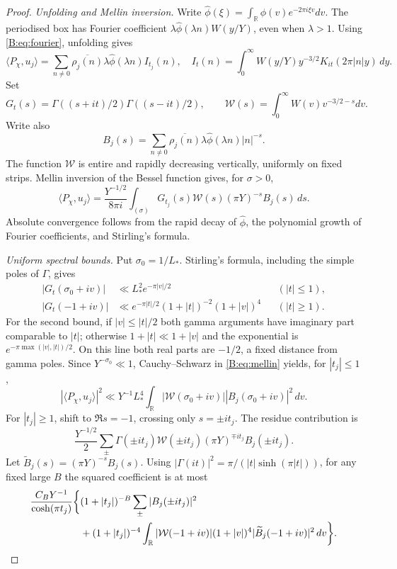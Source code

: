 \documentclass[10pt,reqno]{amsart}
\theoremstyle{definition}
\numberwithin{equation}{section}
\newcommand{\R}{\mathbb R}
\begin{document}
\begin{proof}
\emph{Unfolding and Mellin inversion.}
Write \(\widehat\phi(\xi)=\int_\R\phi(v)e^{-2\pi i\xi v}dv\).
The periodised box has Fourier coefficient
\(\lambda\widehat\phi(\lambda n)W(y/Y)\), even when \(\lambda>1\).
Using \eqref{B:eq:fourier}, unfolding gives
\[
 \langle P_\chi,u_j\rangle
 =\sum_{n\ne0}\overline{\rho_j(n)}\lambda\widehat\phi(\lambda n)I_{t_j}(n),
 \quad I_t(n)=\int_0^\infty W(y/Y)y^{-3/2}K_{it}(2\pi|n|y)\,dy.
\]
Set
\[
 G_t(s)=\Gamma((s+it)/2)\Gamma((s-it)/2),\qquad
 \mathcal W(s)=\int_0^\infty W(v)v^{-3/2-s}dv.
\]
Write also
\[
 B_j(s)=\sum_{n\ne0}\overline{\rho_j(n)}
              \lambda\widehat\phi(\lambda n)|n|^{-s}.
\]
The function \(\mathcal W\) is entire and rapidly decreasing vertically,
uniformly on fixed strips. Mellin inversion of the Bessel function gives,
for \(\sigma>0\),
\begin{equation}\label{B:eq:mellin}
 \langle P_\chi,u_j\rangle
 =\frac{Y^{-1/2}}{8\pi i}\int_{(\sigma)}
        G_{t_j}(s)\mathcal W(s)(\pi Y)^{-s}B_j(s)\,ds.
\end{equation}
Absolute convergence follows from the rapid decay of
\(\widehat\phi\), the polynomial growth of Fourier coefficients, and
Stirling's formula.

\emph{Uniform spectral bounds.}
Put \(\sigma_0=1/L_*\). Stirling's formula, including the simple poles
of \(\Gamma\), gives
\begin{align*}
 |G_t(\sigma_0+iv)|&\ll L_*^2e^{-\pi|v|/2} &&(|t|\le1),\\
 |G_t(-1+iv)|&\ll e^{-\pi|t|/2}(1+|t|)^{-2}(1+|v|)^4
                                      &&(|t|\ge1).
\end{align*}
For the second bound, if \(|v|\le|t|/2\) both gamma arguments have
imaginary part comparable to \(|t|\); otherwise
\(1+|t|\ll1+|v|\) and the exponential is
\(e^{-\pi\max(|v|,|t|)/2}\). On this line both real parts are \(-1/2\),
a fixed distance from gamma poles. Since \(Y^{-\sigma_0}\ll1\),
Cauchy--Schwarz in \eqref{B:eq:mellin} yields, for \(|t_j|\le1\),
\[
 |\langle P_\chi,u_j\rangle|^2
 \ll Y^{-1}L_*^4\int_\R |\mathcal W(\sigma_0+iv)|
                                    |B_j(\sigma_0+iv)|^2\,dv.
\]
For \(|t_j|\ge1\), shift to \(\Re s=-1\), crossing only \(s=\pm it_j\).
The residue contribution is
\[
 \frac{Y^{-1/2}}2\sum_\pm
       \Gamma(\pm it_j)\mathcal W(\pm it_j)(\pi Y)^{\mp it_j}B_j(\pm it_j).
\]
Let \(\widetilde B_j(s)=(\pi Y)^{-s}B_j(s)\).
Using \(|\Gamma(it)|^2=\pi/(|t|\sinh(\pi|t|))\), for any fixed large
\(B\) the squared coefficient is at most
\begin{align}\label{B:eq:high-t}
 \frac{C_BY^{-1}}{\cosh(\pi t_j)}\bigg\{&
 (1+|t_j|)^{-B}\sum_\pm|B_j(\pm it_j)|^2\notag\\
 &+(1+|t_j|)^{-4}\int_\R
  |\mathcal W(-1+iv)|(1+|v|)^4|\widetilde B_j(-1+iv)|^2\,dv\bigg\}.
\end{align}


\end{proof}
\end{document}
